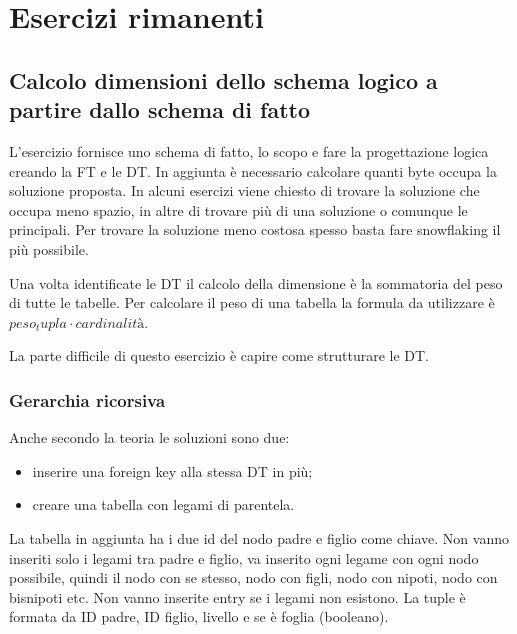 \section{Esercizi rimanenti}
\subsection{Calcolo dimensioni dello schema logico a partire dallo schema di fatto}
L'esercizio fornisce uno schema di fatto, lo scopo e fare la progettazione logica creando la FT e le DT. In aggiunta è necessario calcolare quanti byte occupa la soluzione proposta. In alcuni esercizi viene chiesto di trovare la soluzione che occupa meno spazio, in altre di trovare più di una soluzione o comunque le principali. Per trovare la soluzione meno costosa spesso basta fare snowflaking il più possibile.\newline

\noindent Una volta identificate le DT il calcolo della dimensione è la sommatoria del peso di tutte le tabelle. Per calcolare il peso di una tabella la formula da utilizzare è $peso_tupla \cdot cardinalità$.\newline

\noindent La parte difficile di questo esercizio è capire come strutturare le DT.

\subsubsection{Gerarchia ricorsiva}
Anche secondo la teoria le soluzioni sono due:
\begin{itemize}
	\item inserire una foreign key alla stessa DT in più;
	\item creare una tabella con legami di parentela.
\end{itemize}
La tabella in aggiunta ha i due id del nodo padre e figlio come chiave. Non vanno inseriti solo i legami tra padre e figlio, va inserito ogni legame con ogni nodo possibile, quindi il nodo con se stesso, nodo con figli, nodo con nipoti, nodo con bisnipoti etc. Non vanno inserite entry se i legami non esistono. La tuple è formata da ID padre, ID figlio, livello e se è foglia (booleano).
